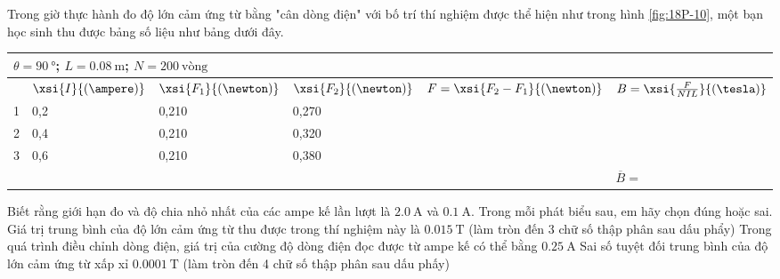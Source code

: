 \begin{ex}
	Trong giờ thực hành đo độ lớn cảm ứng từ bằng "cân dòng điện" với bố trí thí nghiệm được thể hiện như trong hình \ref{fig:18P-10}, một bạn học sinh thu được bảng số liệu như bảng dưới đây.
	\begin{center}
		\begin{tabular}{|M{2cm}|M{2cm}|M{2cm}|M{2cm}|M{4cm}|M{3.5cm}|}
			\hline
			\\
			\hline
			 & $\xsi{I}{\left(\ampere\right)}$ & $\xsi{F_1}{\left(\newton\right)}$ & $\xsi{F_2}{\left(\newton\right)}$ & $F=\xsi{F_2-F_1}{\left(\newton\right)}$ & $B=\xsi{\frac{F}{NIL}}{\left(\tesla\right)}$\\
			 & 0,2 & 0,210 & 0,270 &&\\
			 & 0,4 & 0,210 & 0,320 & &\\
			 & 0,6 & 0,210 & 0,380 & &\\
			\hline
			 &$\overline{B}=$\\
			\hline
			
		\end{tabular}
	\end{center}
Biết rằng giới hạn đo và độ chia nhỏ nhất của các ampe kế lần lượt là $\SI{2.0}{\ampere}$ và $\SI{0.1}{\ampere}$. Trong mỗi phát biểu sau, em hãy chọn đúng hoặc sai.
	{Giá trị trung bình của độ lớn cảm ứng từ thu được trong thí nghiệm này là $\SI{0.015}{\tesla}$ (làm tròn đến 3 chữ số thập phân sau dấu phẩy)}
	{Trong quá trình điều chỉnh dòng điện, giá trị của cường độ dòng điện đọc được từ ampe kế có thể bằng $\SI{0.25}{\ampere}$}
	{Sai số tuyệt đối trung bình của độ lớn cảm ứng từ xấp xỉ $\SI{0.0001}{\tesla}$ (làm tròn đến 4 chữ số thập phân sau dấu phấy)}
\end{ex}
